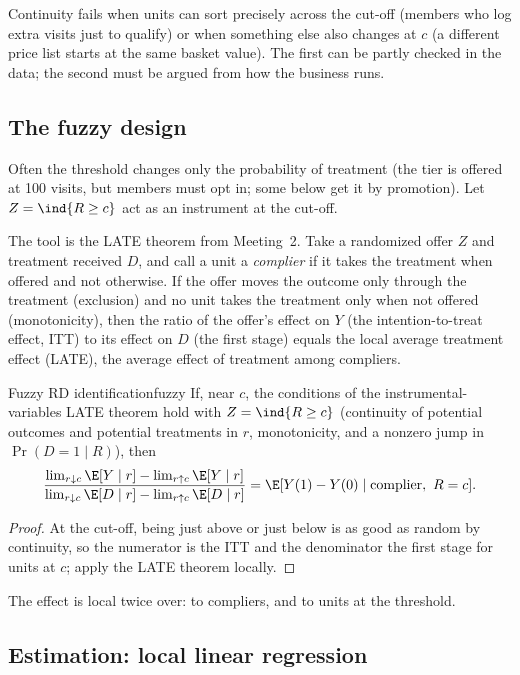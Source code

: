 \documentclass[11pt]{article}
\begin{document}
Continuity fails when units can sort precisely across the cut-off (members who log extra visits just to qualify) or when something else
also changes at $c$ (a different price list starts at the same basket value). The first can be partly checked in the data; the second must be
argued from how the business runs.

\subsection{The fuzzy design}

Often the threshold changes only the probability of treatment (the tier is offered at 100 visits, but members must opt in; some below get it by
promotion). Let $Z = \ind{R \ge c}$ act as an instrument at the cut-off.

The tool is the LATE theorem from Meeting~2. Take a randomized offer $Z$ and treatment received $D$, and call a unit a
\emph{complier} if it takes the treatment when offered and not otherwise. If the offer moves the outcome only through the
treatment (exclusion) and no unit takes the treatment only when not offered (monotonicity), then the ratio of the offer's effect on $Y$
(the intention-to-treat effect, ITT) to its effect on $D$ (the first stage) equals the local average treatment effect (LATE), the
average effect of treatment among compliers.

\begin{prop}{Fuzzy RD identification}{fuzzy}
If, near $c$, the conditions of the instrumental-variables LATE theorem hold with $Z = \ind{R \ge c}$ (continuity of potential outcomes and potential
treatments in $r$, monotonicity, and a nonzero jump in $\Pr(D = 1 \mid R)$), then
\[
  \frac{\lim_{r \downarrow c}\E[Y \mid r] - \lim_{r \uparrow c}\E[Y \mid r]}{\lim_{r \downarrow c}\E[D \mid r] - \lim_{r \uparrow c}\E[D \mid r]}
  = \E[Y(1) - Y(0) \mid \text{complier},\ R = c] .
\]
\end{prop}
\begin{proof}
At the cut-off, being just above or just below is as good as random by continuity, so the numerator is the ITT and the denominator the first stage
for units at $c$; apply the LATE theorem locally.
\end{proof}

The effect is local twice over: to compliers, and to units at the threshold.

\subsection{Estimation: local linear regression}
\end{document}
